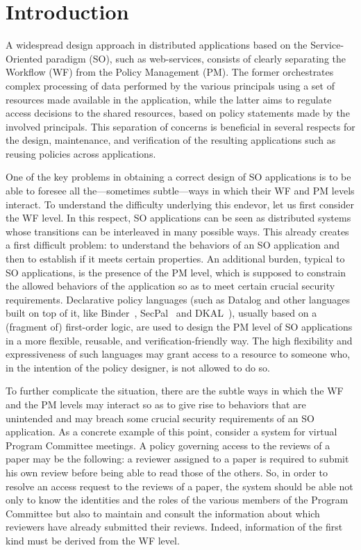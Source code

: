 \documentclass[conference]{IEEEtran}
\begin{document}
\section{Introduction}

A widespread design approach 
in distributed applications based on the
Service-Oriented paradigm (SO), such as web-services, consists of
clearly separating the Workflow (WF) from the Policy Management (PM).
The former orchestrates complex processing of data performed by the
various principals using a set of resources made available in the
application, while the latter aims to regulate access decisions to the
shared resources, based on policy statements made by the involved
principals. This separation of concerns is beneficial in several
respects for the design, maintenance, and verification of the
resulting applications such as reusing policies across applications.

One of the key problems in obtaining a correct design of SO
applications is to be able to foresee all the---sometimes
subtle---ways in which their WF and PM levels interact. To understand
the difficulty underlying this endevor, let us first consider the WF
level. In this respect, SO applications can be seen as distributed
systems whose transitions can be interleaved in many possible
ways. This already creates a first difficult problem: to understand the behaviors of an SO application
and then to establish if it meets certain properties. An additional
burden, typical to SO applications, is the presence of the PM level,
which is supposed to constrain the allowed behaviors of the
application so as to meet certain crucial security
requirements. Declarative policy languages (such as Datalog and other
languages built on top of it, like Binder~\cite{deTreville:Binder},
SecPal~\cite{SecPAL-homepage} and DKAL~\cite{DKAL-homepage}), usually
based on a (fragment of) first-order logic, are used to design the PM
level of SO applications in a more flexible, reusable, and
verification-friendly way. The high flexibility and expressiveness of
such languages may grant access to a resource to someone who, in the
intention of the policy designer, is not allowed to do so.

To further complicate the situation, there are the subtle ways in which the WF and the PM levels may interact so as to give rise to behaviors that are unintended and may breach some crucial security requirements of an SO application. As a concrete example of this point, consider a system for virtual Program Committee meetings. A policy governing access to the reviews of a paper may be the following: a reviewer assigned to a paper is required to submit his own review before being able to read those of the others.  So, in order to resolve an access request to the reviews of a paper, the system should be able not only to know the identities and the roles of the various members of the Program Committee but also to maintain and consult the information about which reviewers have already submitted their reviews. Indeed, information of the first kind must be derived from the WF level.
\end{document}
